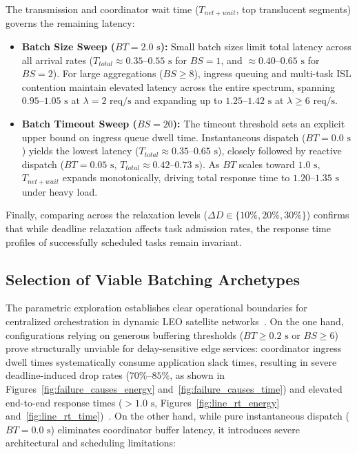 The transmission and coordinator wait time ($T_{net+wait}$, top translucent segments) governs the remaining latency:
\begin{itemize}
    \item \textbf{Batch Size Sweep ($BT = 2.0\text{ s}$):} Small batch sizes limit total latency across all arrival rates ($T_{total} \approx 0.35\text{--}0.55\text{ s}$ for $BS=1$, and $\approx 0.40\text{--}0.65\text{ s}$ for $BS=2$). For large aggregations ($BS \ge 8$), ingress queuing and multi-task ISL contention maintain elevated latency across the entire spectrum, spanning $0.95\text{--}1.05\text{ s}$ at $\lambda=2\text{ req/s}$ and expanding up to $1.25\text{--}1.42\text{ s}$ at $\lambda \ge 6\text{ req/s}$.
    \item \textbf{Batch Timeout Sweep ($BS = 20$):} The timeout threshold sets an explicit upper bound on ingress queue dwell time. Instantaneous dispatch ($BT = 0.0\text{ s}$) yields the lowest latency ($T_{total} \approx 0.35\text{--}0.65\text{ s}$), closely followed by reactive dispatch ($BT = 0.05\text{ s}$, $T_{total} \approx 0.42\text{--}0.73\text{ s})$. As $BT$ scales toward $1.0\text{ s}$, $T_{net+wait}$ expands monotonically, driving total response time to $1.20\text{--}1.35\text{ s}$ under heavy load.
\end{itemize}
Finally, comparing across the relaxation levels ($\Delta D \in \{10\%, 20\%, 30\%\}$) confirms that while deadline relaxation affects task admission rates, the response time profiles of successfully scheduled tasks remain invariant.
\FloatBarrier
\subsection{Selection of Viable Batching Archetypes}
\label{subsec:selection_archetypes}

The parametric exploration establishes clear operational boundaries for centralized orchestration in dynamic LEO satellite networks~\cite{icdcs_satellite_2025, survey_orbital_edge_2023}. On the one hand, configurations relying on generous buffering thresholds ($BT \ge 0.2\text{ s}$ or $BS \ge 6$) prove structurally unviable for delay-sensitive edge services: coordinator ingress dwell times systematically consume application slack times, resulting in severe deadline-induced drop rates ($70\%\text{--}85\%$, as shown in Figures~\ref{fig:failure_causes_energy} and~\ref{fig:failure_causes_time})
and elevated end-to-end response times ($> 1.0\text{ s}$, Figures~\ref{fig:line_rt_energy} and~\ref{fig:line_rt_time})~\cite{icdcs_satellite_2025}.
On the other hand, while pure instantaneous dispatch ($BT = 0.0\text{ s}$) eliminates coordinator buffer latency, it introduces severe architectural and scheduling limitations:

